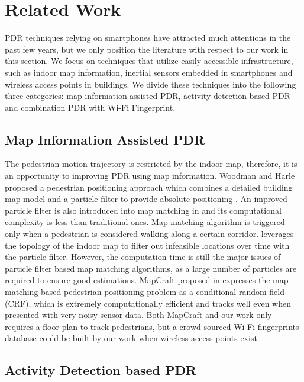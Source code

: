 \documentclass{llncs}
\begin{document}
\section{Related Work}

PDR techniques relying on smartphones have attracted much attentions in the past few years, but we only position the literature with respect to our work in this section. We focus on techniques that utilize easily accessible infrastructure, such as indoor map information, inertial sensors embedded in smartphones and wireless access points in buildings. We divide these techniques into the following three categories: map information assisted PDR, activity detection based PDR and combination PDR with Wi-Fi Fingerprint. 

\subsection{Map Information Assisted PDR}

The pedestrian motion trajectory is restricted by the indoor map, therefore, it is an opportunity to improving PDR using map information. Woodman and Harle proposed a pedestrian positioning approach which combines a detailed building map model and a particle filter to provide absolute positioning \cite{woodman2008pedestrian}. An improved particle filter is also introduced into map matching in \cite{bao2013indoor} and its computational complexity is less than traditional ones. Map matching algorithm is triggered only when a pedestrian is considered walking along a certain corridor. \cite{rai2012zee} leverages the topology of the indoor map to filter out infeasible locations over time with the particle filter. However, the computation time is still the major issues of particle filter based map matching algorithms, as a large number of particles are required to ensure good estimations. MapCraft proposed in \cite{xiao2014lightweight} expresses the map matching based pedestrian positioning problem as a conditional random field (CRF), which is extremely computationally efficient and tracks well even when presented with very noisy sensor data. Both MapCraft and our work only requires a floor plan to track pedestrians, but a crowd-sourced Wi-Fi fingerprints database could be built by our work when wireless access points exist. 

\subsection{Activity Detection based PDR}
\end{document}
